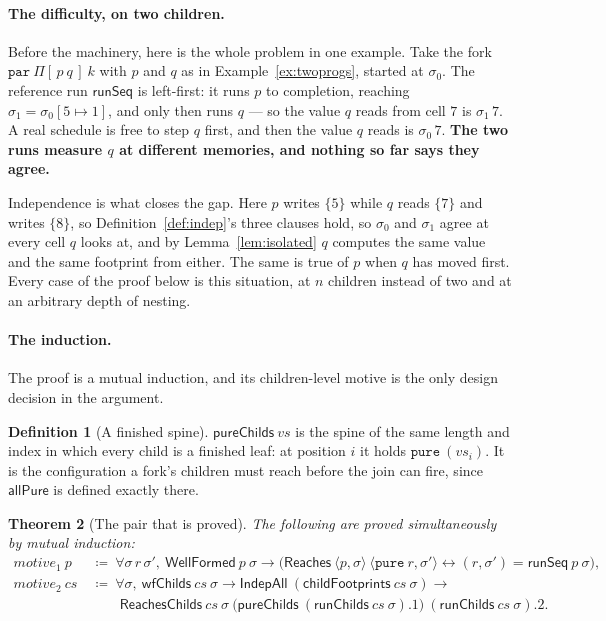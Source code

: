 \documentclass[11pt,a4paper]{article}
\theoremstyle{definition}
\newtheorem{definition}{Definition}
\theoremstyle{plain}
\newtheorem{theorem}[definition]{Theorem}
\theoremstyle{remark}
\newcommand{\st}{\sigma}
\newcommand{\runSeq}{\mathsf{runSeq}}
\newcommand{\wf}{\mathsf{WellFormed}}
\newcommand{\Reaches}{\mathsf{Reaches}}
\newcommand{\upd}[3]{#1[#2 \mapsto #3]}
\begin{document}
\paragraph{The difficulty, on two children.}
Before the machinery, here is the whole problem in one example. Take the fork
$\texttt{par}\ \Pi[\,p\ q\,]\ k$ with $p$ and $q$ as in Example~\ref{ex:twoprogs}, started at
$\st_0$. The reference run $\runSeq$ is left-first: it runs $p$ to completion, reaching
$\st_1 = \upd{\st_0}{5}{1}$, and only then runs $q$ --- so the value $q$ reads from cell $7$
is $\st_1\,7$. A real schedule is free to step $q$ first, and then the value $q$ reads is
$\st_0\,7$. \textbf{The two runs measure $q$ at different memories, and nothing so far says
they agree.}

Independence is what closes the gap. Here $p$ writes $\{5\}$ while $q$ reads $\{7\}$ and
writes $\{8\}$, so Definition~\ref{def:indep}'s three clauses hold, so $\st_0$ and $\st_1$
agree at every cell $q$ looks at, and by Lemma~\ref{lem:isolated} $q$ computes the same value
and the same footprint from either. The same is true of $p$ when $q$ has moved first. Every
case of the proof below is this situation, at $n$ children instead of two and at an arbitrary
depth of nesting.

\paragraph{The induction.}
The proof is a mutual induction, and its children-level motive is the only design decision in
the argument.

\begin{definition}[A finished spine]\label{def:purechilds}
$\mathsf{pureChilds}\ vs$ is the spine of the same length and index in which every child is a
finished leaf: at position $i$ it holds $\texttt{pure}\ (vs_i)$. It is the configuration a
fork's children must reach before the join can fire, since $\mathsf{allPure}$ is defined
exactly there.
\end{definition}

\begin{theorem}[The pair that is proved]\label{thm:canonicalpair}
The following are proved simultaneously by mutual induction:
\begin{align*}
  \mathit{motive}_1\ p \ &\coloneqq\ \forall \st\,r\,\st',\ \wf\ p\ \st \to
    \bigl(\Reaches\ \langle p, \st\rangle\ \langle \texttt{pure}\ r, \st'\rangle \leftrightarrow (r,\st') = \runSeq\ p\ \st\bigr), \\
  \mathit{motive}_2\ cs \ &\coloneqq\ \forall \st,\ \mathsf{wfChilds}\ cs\ \st \to
    \mathsf{IndepAll}\ (\mathsf{childFootprints}\ cs\ \st) \to \\
  &\qquad \mathsf{ReachesChilds}\ cs\ \st\ \bigl(\mathsf{pureChilds}\ (\mathsf{runChilds}\ cs\ \st).1\bigr)\ (\mathsf{runChilds}\ cs\ \st).2 .
\end{align*}
\end{theorem}
\end{document}
